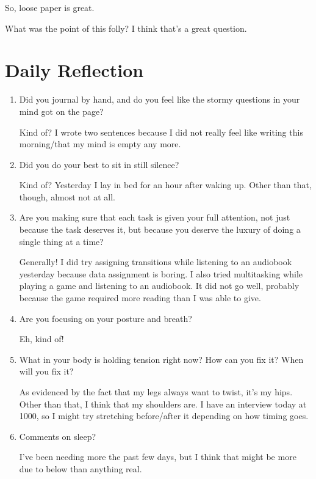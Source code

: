 \documentclass[12pt]{article}
\renewcommand{\,}{\textsuperscript{,}}
\begin{document}
So, loose paper is great.

What was the point of this folly?  
I think that's a great question.

\section{Daily Reflection}

\begin{enumerate}

\item Did you journal by hand, and do you feel like the stormy questions in your mind got on the page?

Kind of? I wrote two sentences because I did not really feel like writing this morning/that my mind is empty any more.

\item Did you do your best to sit in still silence?

Kind of? Yesterday I lay in bed for an hour after waking up. Other than that, though, almost not at all.

\item Are you making sure that each task is given your full attention, not just because the task deserves it, but because you deserve the luxury of doing a single thing at a time?

Generally! I did try assigning transitions while listening to an audiobook yesterday because data assignment is boring.  
I also tried multitasking while playing a game and listening to an audiobook. It did not go well, probably because the game required more reading than I was able to give.

\item Are you focusing on your posture and breath?

Eh, kind of!

\item What in your body is holding tension right now? How can you fix it? When will you fix it?

As evidenced by the fact that my legs always want to twist, it's my hips.  
Other than that, I think that my shoulders are.  
I have an interview today at 1000, so I might try stretching before/after it depending on how timing goes.

\item Comments on sleep?

I've been needing more the past few days, but I think that might be more due to below than anything real.


\end{enumerate}
\end{document}
